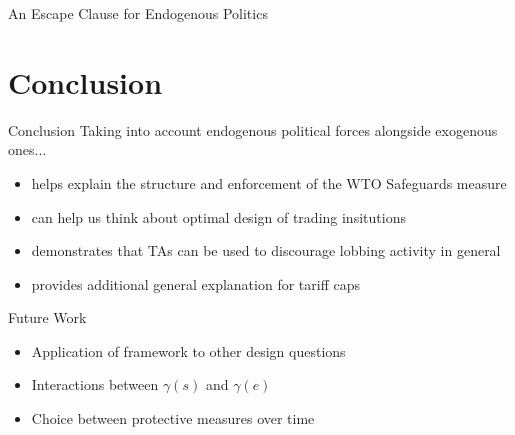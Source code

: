 \documentclass{beamer}
\newcommand{\ga}{\gamma}
\begin{document}
{\begin{frame}{An Escape Clause for Endogenous Politics}
\end{frame}






\section{Conclusion}

\begin{frame}{Conclusion}
Taking into account endogenous political forces alongside exogenous ones...
\pause
\begin{itemize}[<+->]
		\item helps explain the structure and enforcement of the WTO Safeguards measure
		\item can help us think about optimal design of trading insitutions
		\item demonstrates that TAs can be used to discourage lobbing activity in general
		\item provides additional general explanation for tariff caps
\end{itemize}

\end{frame}

\begin{frame}{Future Work}
\pause
\begin{itemize}[<+->]
	\item Application of framework to other design questions
	\item Interactions between $\ga(s)$ and $\ga(e)$
	\item Choice between protective measures over time
\end{itemize}


\end{frame}}
\end{document}
